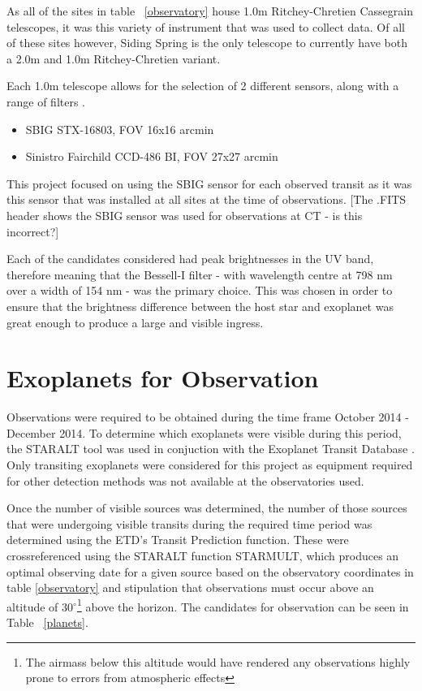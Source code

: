 \documentclass{article}
\begin{document}
As all of the sites in table ~\ref{observatory} house 1.0m Ritchey-Chretien Cassegrain telescopes, it was this variety of instrument that was used to collect data. Of all of these sites however, Siding Spring is the only telescope to currently have both a 2.0m and 1.0m Ritchey-Chretien variant. 

Each 1.0m telescope allows for the selection of 2 different sensors, along with a range of filters \parencite{1m}.

\begin{itemize}

  \item SBIG STX-16803, FOV 16x16 arcmin
  \item Sinistro Fairchild CCD-486 BI, FOV 27x27 arcmin

\end{itemize} 

This project focused on using the SBIG sensor for each observed transit as it was this sensor that was installed at all sites at the time of observations. [The .FITS header shows the SBIG sensor was used for observations at CT - is this incorrect?]

Each of the candidates considered had peak brightnesses in the UV band, therefore meaning that the Bessell-I filter - with wavelength centre at 798 nm over a width of 154 nm - was the primary choice. This was chosen in order to ensure that the brightness difference between the host star and exoplanet was great enough to produce a large and visible ingress.


\section{Exoplanets for Observation}
Observations were required to be obtained during the time frame October 2014 - December 2014. To determine which exoplanets were visible during this period, the STARALT tool \parencite{staralt} was used in conjuction with the Exoplanet Transit Database \parencite{etd}. Only transiting exoplanets were considered for this project as equipment required for other detection methods was not available at the observatories used. 

Once the number of visible sources was determined, the number of those sources that were undergoing visible transits during the required time period was determined using the ETD's Transit Prediction function. These were crossreferenced using the STARALT function STARMULT, which produces an optimal observing date for a given source based on the observatory coordinates in table \ref{observatory} and stipulation that observations must occur above an altitude of 30$^\circ$\footnote{The airmass below this altitude would have rendered any observations highly prone to errors from atmospheric effects} above the horizon. The candidates for observation can be seen in Table ~\ref{planets}.
\end{document}
